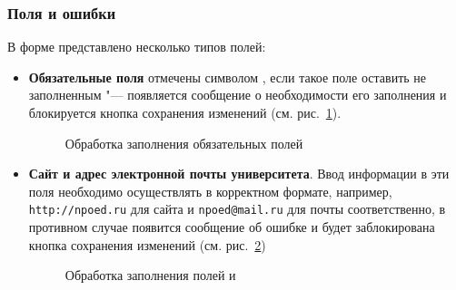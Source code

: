 	\subsubsection{Поля и ошибки}
	В форме представлено несколько типов полей:
	\begin{itemize}
		\item \textbf{Обязательные поля} отмечены символом \quotes{*}, если такое поле оставить не заполненным "--- появляется сообщение о необходимости его заполнения и блокируется кнопка сохранения изменений (см. рис.~\ref{university:edit_required}).
		
		\begin{figure}[H]
		\caption{Обработка заполнения обязательных полей}
		\label{university:edit_required}
		\end{figure}	
	
		\item \textbf{Сайт и адрес электронной почты университета}. Ввод информации в эти поля необходимо осуществлять в корректном формате, например, \texttt{http://npoed.ru} для сайта и \texttt{npoed@mail.ru} для почты соответственно, в противном случае появится сообщение об ошибке и будет заблокирована кнопка сохранения изменений (см. рис.~\ref{university:edit_url_email})
		
		\begin{figure}[H]
		\caption{Обработка заполнения полей  и }
		\label{university:edit_url_email}
		\end{figure}	
		

\end{itemize}

